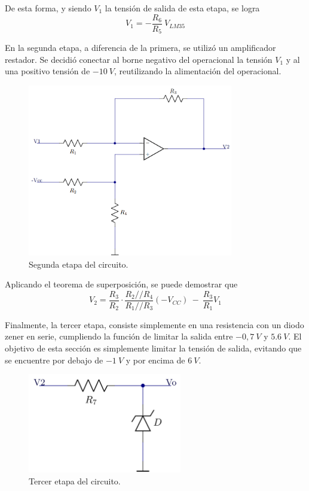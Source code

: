 \documentclass[a4paper]{article}
\begin{document}
De esta forma, y siendo $V_1$ la tensión de salida de esta etapa, se logra
\[
	V_1 = -\frac{R_6}{R_5} \ V_{LM35}
\]

En la segunda etapa, a diferencia de la primera, se utilizó un amplificador restador. Se decidió conectar al borne negativo del operacional la tensión $V_1$ y al  una positivo tensión de $- 10 \ V$, reutilizando la alimentación del operacional.

\begin{figure}[H]
	\centering
	\includegraphics[width=0.8\textwidth]{Ejercicio6/Imagenes/CircuitoEtapa2-M1.png}
	\caption{Segunda etapa del circuito.}
	\label{fig:cir2-M1}
\end{figure}

Aplicando el teorema de superposición, se puede demostrar que
\[
	V_2 = \frac{R_3}{R_2} \cdot \frac{R_2 // R_4}{R_1 // R_3} \left( -V_{CC} \right) \ - \ \frac{R_3}{R_1} V_1
\]

Finalmente, la tercer etapa, consiste simplemente en una resistencia con un diodo zener en serie, cumpliendo la función de limitar la salida entre $-0,7 \ V$ y $5.6 \ V$. El objetivo de esta sección es simplemente limitar la tensión de salida, evitando que se encuentre por debajo de $-1 \ V$ y por encima de $6 \ V$.

\begin{figure}[H]
	\centering
	\includegraphics[width=0.6\textwidth]{Ejercicio6/Imagenes/CircuitoEtapa3-M1.png}
	\caption{Tercer etapa del circuito.}
	\label{fig:cir3}
\end{figure}
\end{document}
